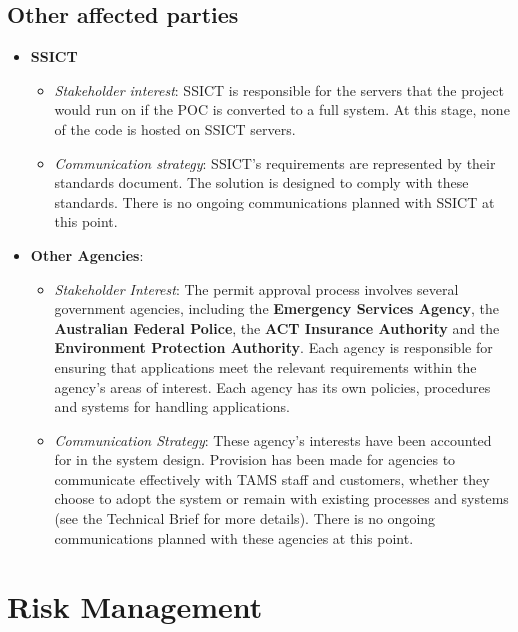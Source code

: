 \documentclass[12pt,a4paper,twosided]{article}
\begin{document}
\subsection{Other affected parties}

\begin{itemize}
\itemsep1pt\parskip0pt
\item
  \textbf{SSICT}

  \begin{itemize}
  \itemsep1pt\parskip0pt
  \item
    \emph{Stakeholder interest}: SSICT is responsible for the servers
    that the project would run on if the POC is converted to a full
    system. At this stage, none of the code is hosted on SSICT servers.
  \item
    \emph{Communication strategy}: SSICT's requirements are represented
    by their standards document. The solution is designed to comply with
    these standards. There is no ongoing communications planned with
    SSICT at this point.
  \end{itemize}
\item
  \textbf{Other Agencies}:

  \begin{itemize}
  \itemsep1pt\parskip0pt
  \item
    \emph{Stakeholder Interest}: The permit approval process involves
    several government agencies, including the \textbf{Emergency
    Services Agency}, the \textbf{Australian Federal Police}, the
    \textbf{ACT Insurance Authority} and the \textbf{Environment
    Protection Authority}. Each agency is responsible for ensuring that
    applications meet the relevant requirements within the agency's
    areas of interest. Each agency has its own policies, procedures and
    systems for handling applications.
  \item
    \emph{Communication Strategy}: These agency's interests have been
    accounted for in the system design. Provision has been made for
    agencies to communicate effectively with TAMS staff and customers,
    whether they choose to adopt the system or remain with existing
    processes and systems (see the Technical Brief for more details).
    There is no ongoing communications planned with these agencies at
    this point.
  \end{itemize}
\end{itemize}

\section{Risk Management}
\end{document}
